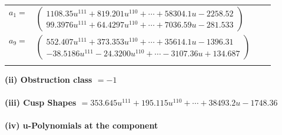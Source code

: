 \documentclass[1p]{elsarticle_modified}
\theoremstyle{definition}
\begin{document}
\begin{tabular}{m{7pt} m{180pt} m{7pt} m{180pt} }
\flushright $a_{1}=$&$\begin{pmatrix}1108.35 u^{111}+819.201 u^{110}+\cdots+58304.1 u-2258.52\\99.3976 u^{111}+64.4297 u^{110}+\cdots+7036.59 u-281.533\end{pmatrix}$ \\
\flushright $a_{9}=$&$\begin{pmatrix}552.407 u^{111}+373.353 u^{110}+\cdots+35614.1 u-1396.31\\-38.5186 u^{111}-24.3200 u^{110}+\cdots-3107.36 u+134.687\end{pmatrix}$\\&\end{tabular}
\flushleft \textbf{(ii) Obstruction class $= -1$}\\~\\
\flushleft \textbf{(iii) Cusp Shapes $= 353.645 u^{111}+195.115 u^{110}+\cdots+38493.2 u-1748.36$}\\~\\
\newpage\renewcommand{\arraystretch}{1}
\flushleft \textbf{(iv) u-Polynomials at the component}\newline \\
\end{document}
